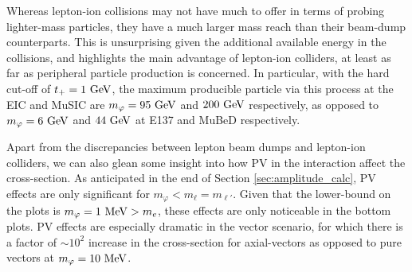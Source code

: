 Whereas lepton-ion collisions may not have much to offer in terms of probing lighter-mass particles, they have a much larger mass reach than their beam-dump counterparts. This is unsurprising given the additional available energy in the collisions, and highlights the main advantage of lepton-ion colliders, at least as far as peripheral particle production is concerned. In particular, with the hard cut-off of $t_+ = 1~{\rm GeV}$, the maximum producible particle via this process at the EIC and MuSIC are $m_\varphi = 95~{\rm GeV}$ and $200~{\rm GeV}$ respectively, as opposed to $m_\varphi = 6~{\rm GeV}$ and $44~{\rm GeV}$ at E137 and MuBeD respectively. 

Apart from the discrepancies between lepton beam dumps and lepton-ion colliders, we can also glean some insight into how PV in the interaction affect the cross-section. As anticipated in the end of Section \ref{sec:amplitude_calc}, PV effects are only significant for $m_\varphi < m_\ell = m_{\ell'}$. Given that the lower-bound on the plots is $m_\varphi = 1~{\rm MeV} > m_e$, these effects are only noticeable in the bottom plots. PV effects are especially dramatic in the vector scenario, for which there is a factor of $\sim 10^2$ increase in the cross-section for axial-vectors as opposed to pure vectors at $m_\varphi = 10~{\rm MeV}$.

